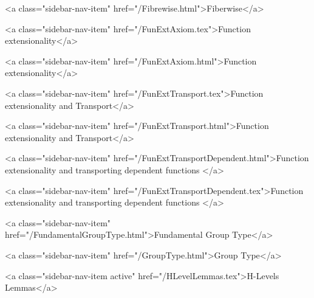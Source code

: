       
    
      
        
          <a class="sidebar-nav-item" href="/Fibrewise.html">Fiberwise</a>
        
      
    
      
        
          <a class="sidebar-nav-item" href="/FunExtAxiom.tex">Function extensionality</a>
        
      
    
      
        
          <a class="sidebar-nav-item" href="/FunExtAxiom.html">Function extensionality</a>
        
      
    
      
        
          <a class="sidebar-nav-item" href="/FunExtTransport.tex">Function extensionality and Transport</a>
        
      
    
      
        
          <a class="sidebar-nav-item" href="/FunExtTransport.html">Function extensionality and Transport</a>
        
      
    
      
        
          <a class="sidebar-nav-item" href="/FunExtTransportDependent.html">Function extensionality and transporting dependent functions </a>
        
      
    
      
        
          <a class="sidebar-nav-item" href="/FunExtTransportDependent.tex">Function extensionality and transporting dependent functions </a>
        
      
    
      
        
          <a class="sidebar-nav-item" href="/FundamentalGroupType.html">Fundamental Group Type</a>
        
      
    
      
        
          <a class="sidebar-nav-item" href="/GroupType.html">Group Type</a>
        
      
    
      
        
          <a class="sidebar-nav-item active" href="/HLevelLemmas.tex">H-Levels Lemmas</a>
        
      
    
